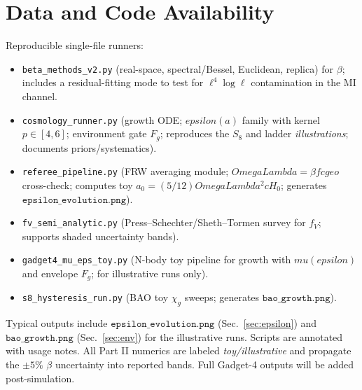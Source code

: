 \documentclass[aps,prd,onecolumn,superscriptaddress,nofootinbib]{revtex4-2}
\def\OmL{OmegaLambda}%
\def\cgeo{cgeo}%
\def\eps{epsilon}%
\def\mu{mu}%
\def\Omega_\Lambda{OmegaLambda}%
\providecommand{\OmL}{\Omega_\Lambda}
\providecommand{\cgeo}{c_{\rm geo}}
\providecommand{\eps}{\varepsilon}
\begin{document}
\section{Data and Code Availability}
\label{sec:data}
Reproducible single-file runners:
\begin{itemize}[leftmargin=*]
\item \texttt{beta\_methods\_v2.py} (real-space, spectral/Bessel, Euclidean, replica) for \(\beta\); includes a residual-fitting mode to test for \(\ell^4\log\ell\) contamination in the MI channel.
\item \texttt{cosmology\_runner.py} (growth ODE; $\eps(a)$ family with kernel $p\in[4,6]$; environment gate $F_g$; reproduces the $S_8$ and ladder \emph{illustrations}; documents priors/systematics).
\item \texttt{referee\_pipeline.py} (FRW averaging module; \(\OmL=\beta f\cgeo\) cross-check; computes toy \(a_0=(5/12)\OmL^2 c H_0\); generates \(\texttt{epsilon\_evolution.png}\)).
\item \texttt{fv\_semi\_analytic.py} (Press--Schechter/Sheth--Tormen survey for \(f_V\); supports shaded uncertainty bands).
\item \texttt{gadget4\_mu\_eps\_toy.py} (N-body toy pipeline for growth with \(\mu(\eps)\) and envelope \(F_g\); for illustrative runs only).
\item \texttt{s8\_hysteresis\_run.py} (BAO toy \(\chi_g\) sweeps; generates \(\texttt{bao\_growth.png}\)).
\end{itemize}
Typical outputs include \(\texttt{epsilon\_evolution.png}\) (Sec.~\ref{sec:epsilon}) and \(\texttt{bao\_growth.png}\) (Sec.~\ref{sec:env}) for the illustrative runs. Scripts are annotated with usage notes. All Part II numerics are labeled \emph{toy/illustrative} and propagate the \(\pm 5\%\) \(\beta\) uncertainty into reported bands. Full Gadget-4 outputs will be added post-simulation.
\end{document}
